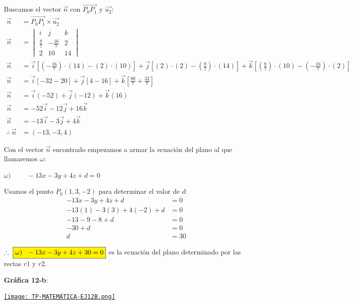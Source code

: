 \noindent Buscamos el vector $\vec{n}$ con $\overrightarrow{P_0P_1}$ y $\vec{u_2}$:
\begin{align*}
	\vec{n}              & = \overrightarrow{P_0P_1} \times \vec{u_2}                         \\
	\vec{n}              & = \begin{vmatrix}
		                          i           & j             & k  \\
		                          \frac{8}{7} & -\frac{16}{7} & 2  \\
		                          2           & 10            & 14
	                          \end{vmatrix}                                 \\
	\vec{n}              & = \vec{i} \left[(-\frac{16}{7})\cdot(14) - (2)\cdot(10) \right]  +
	\vec{j} \left[ (2)\cdot(2) - (\frac{8}{7})\cdot(14) \right] +
	\vec{k} \left[ (\frac{8}{7})\cdot(10) - (-\frac{16}{7})\cdot(2) \right]                    \\
	\vec{n}              & = \vec{i} \left[-32 - 20 \right]  +
	\vec{j} \left[ 4 - 16 \right] +
	\vec{k} \left[ \frac{80}{7} + \frac{32}{7} \right]                                         \\
	\vec{n}              & = \vec{i} (-52) + \vec{j} (- 12) + \vec{k} (16)                    \\
	\vec{n}              & = -52\vec{i}- 12\vec{j} + 16\vec{k}                                \\
	\vec{n}              & = -13\vec{i}- 3\vec{j} + 4\vec{k}                                  \\
	\therefore \ \vec{n} & = \boxed{(-13, -3, 4)}
\end{align*}

\noindent Con el vector $\vec{n}$ encontrado empezamos a armar la ecuación del plano al que llamaremos $\omega$:
\begin{center}
	$\omega) \hspace{1cm} -13x - 3y + 4z + d = 0$
\end{center}

\noindent Usamos el punto $P_0(1, 3, -2)$ para determinar el valor de $d$:
\begin{align*}
	-13x - 3y + 4z + d        & = 0          \\
	-13(1) - 3(3) + 4(-2) + d & = 0          \\
	-13 - 9 - 8 + d           & = 0          \\
	-30 + d                   & = 0          \\
	d                         & = \boxed{30}
\end{align*}

\noindent $\therefore \ \fcolorbox{black}{yellow}{$\omega) \ \ -13x - 3y + 4z + 30 = 0$}$ es la ecuación del plano determinado por las rectas $r1$ y $r2$.

\vspace{2cm}
\noindent \textbf{Gráfica 12-b}:
\begin{center}
	\href{https://www.geogebra.org/3d/n89vhber}{\texttt{[image: TP-MATEMÁTICA-EJ12B.png]}}
\end{center}
